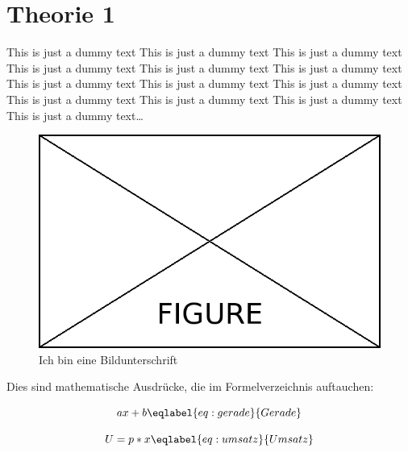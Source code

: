 \section{Theorie 1}
\label{sec:theorieA}

This is just a dummy text This is just a dummy text This is just a dummy text This is just a dummy text This is just a dummy text This is just a dummy text This is just a dummy text This is just a dummy text This is just a dummy text This is just a dummy text This is just a dummy text This is just a dummy text This is just a dummy text\dots

\bigskip
\begin{figure}[H]
	\centering
	\includegraphics[width=\textwidth]{Content/Figures/figure.png}
	\caption{Ich bin eine Bildunterschrift}
	\label{fig:test}
\end{figure}

Dies sind mathematische Ausdrücke, die im Formelverzeichnis auftauchen:

\begin{equation}
ax + b
\eqlabel{eq:gerade}{Gerade}
\end{equation}

\begin{equation}
U = p * x
\eqlabel{eq:umsatz}{Umsatz}
\end{equation}
